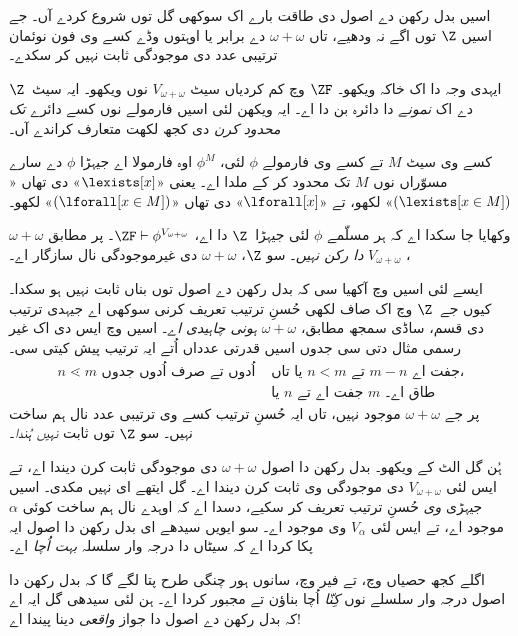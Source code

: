 \documentclass[../../../include/open-logic-section]{subfiles}
\begin{document}

اسیں بدل رکھن دے اصول دی طاقت بارے اک سوکھی گل توں شروع کردے آں۔ جے اسیں $\Z$ توں اگے نہ ودھیے، تاں $\omega + \omega$ دے برابر یا اوہتوں وڈے کسے وی فون نوئمان ترتیبی عدد دی موجودگی ثابت نہیں کر سکدے۔

ایہدی وجہ دا اک خاکہ ویکھو۔ $\ZF$ وچ کم کردیاں سیٹ $V_{\omega+\omega}$ نوں ویکھو۔ ایہ سیٹ~$\Z$ دے اک \emph{نمونے} دا دائرہ بن دا اے۔ ایہ ویکھن لئی اسیں فارمولے نوں کسے دائرے \emph{تک محدود کرن} دی کجھ لکھت متعارف کراندے آں۔
\begin{defn}
	کسے وی سیٹ $M$ تے کسے وی فارمولے $ \phi$ لئی، $\phi^M$ اوہ فارمولا اے جیہڑا $\phi$ دے سارے مسوّراں نوں $M$ تک محدود کر کے ملدا اے۔ یعنی «$\lexists[x]$» دی تھاں «$(\lexists[x \in M])$» لکھو، تے
	«$\lforall[x]$» دی تھاں «$(\lforall[x \in M])$» لکھو۔
\end{defn}\noindent
وکھایا جا سکدا اے کہ ہر مسلّمے $\phi$ لئی جیہڑا~$\Z$ دا اے، $ \ZF \vdash
\phi^{V_{\omega+\omega}}$۔ پر  مطابق $\omega+\omega$، $V_{\omega+\omega}$ \emph{دا رکن نہیں}۔ سو $\Z$، $\omega+\omega$ دی غیرموجودگی نال سازگار اے۔

ایسے لئی اسیں  وچ آکھیا سی کہ
 بدل رکھن دے اصول توں بناں ثابت نہیں ہو سکدا۔ کیوں جے~$\Z$ وچ اک صاف لکھی حُسنِ ترتیب تعریف کرنی سوکھی اے جیہدی ترتیب دی قسم، ساڈی سمجھ مطابق، $\omega+\omega$ \emph{ہونی چاہیدی اے}۔ اسیں  وچ ایس دی اک غیر رسمی مثال دتی سی جدوں اسیں قدرتی عدداں اُتے ایہ ترتیب پیش کیتی سی۔
\begin{align*}
	n \lessdot m \text{ اُدوں تے صرف اُدوں جدوں }&\text{یا تاں }n < m\text{ تے }m-n\text{ جفت اے،}\\
	& \text{یا $n$ جفت اے تے $m$ طاق اے۔}
\end{align*}
پر جے $\omega+\omega$ موجود نہیں، تاں ایہ حُسنِ ترتیب کسے وی ترتیبی عدد نال ہم ساخت نہیں۔ سو $\Z$ توں
 ثابت \emph{نہیں ہُندا}۔

ہُن گل الٹ کے ویکھو۔ بدل رکھن دا اصول $\omega+\omega$ دی موجودگی ثابت کرن دیندا اے، تے ایس لئی $V_{\omega+\omega}$ دی موجودگی وی ثابت کرن دیندا اے۔ گل ایتھے ای نہیں مکدی۔ اسیں جیہڑی \emph{وی} حُسنِ ترتیب تعریف کر سکیے، 
دسدا اے کہ اوہدے نال ہم ساخت کوئی $\alpha$ موجود اے، تے ایس لئی $V_\alpha$ وی موجود اے۔ سو ایویں سیدھے ای بدل رکھن دا اصول ایہ پکا کردا اے کہ سیٹاں دا درجہ وار سلسلہ \emph{بہت اُچا} اے۔

اگلے کجھ حصیاں وچ، تے فیر  وچ، سانوں ہور چنگی طرح پتا لگے گا کہ بدل رکھن دا اصول درجہ وار سلسلے نوں \emph{کِنّا} اُچا بناؤن تے مجبور کردا اے۔ ہن لئی سیدھی گل ایہ اے کہ بدل رکھن دے اصول دا جواز \emph{واقعی} دینا پیندا اے!
\end{document}
